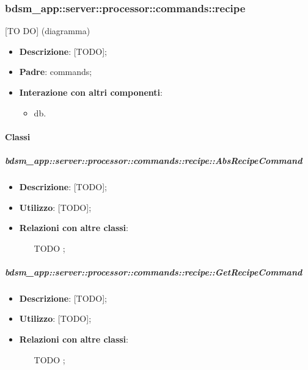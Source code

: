       \subsubsection{bdsm\_app::server::processor::commands::recipe} %
      \label{ssub:bdsm_app_server_processor_commands_recipe}
      [TO DO] (diagramma) \newline \newline

      \begin{itemize}
        \item \textbf{Descrizione}: [TODO];
        \item \textbf{Padre}: commands;
        \item \textbf{Interazione con altri componenti}:
          \begin{itemize}
            \item db.
          \end{itemize}
      \end{itemize}

        \paragraph{Classi} %

        \subparagraph{bdsm\_app::server::processor::commands::recipe::AbsRecipeCommand} %
        \label{subp:bdsm_app_server_processor_commands_recipe_absrecipecommand}
        \begin{itemize}
          \item \textbf{Descrizione}: [TODO];
          \item \textbf{Utilizzo}: [TODO];
          \item \textbf{Relazioni con altre classi}:
            \begin{itemize}
              \item [TODO];
            \end{itemize}
        \end{itemize}

        \subparagraph{bdsm\_app::server::processor::commands::recipe::GetRecipeCommand} %
        \label{subp:bdsm_app_server_processor_commands_recipe_getrecipecommand}
        \begin{itemize}
          \item \textbf{Descrizione}: [TODO];
          \item \textbf{Utilizzo}: [TODO];
          \item \textbf{Relazioni con altre classi}:
            \begin{itemize}
              \item [TODO];
            \end{itemize}
        \end{itemize}

